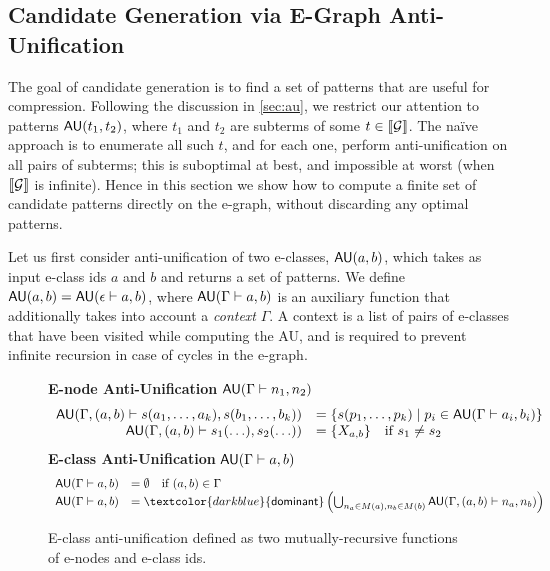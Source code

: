 \subsection{Candidate Generation via E-Graph Anti-Unification}

The goal of candidate generation is to find a set of patterns
that are useful for compression.
%
Following the discussion in \autoref{sec:au},
we restrict our attention to patterns $\mathsf{AU}(t_1, t_2)$,
where $t_1$ and $t_2$ are subterms of some $t \in \llbracket \mathcal{G} \rrbracket$.
%
The na\"ive approach is to enumerate all such $t$,
and for each one, perform anti-unification on all pairs of subterms;
this is suboptimal at best,
and impossible at worst (when $\llbracket \mathcal{G} \rrbracket$ is infinite).
%
Hence in this section we show how to compute a finite set of candidate patterns 
directly on the e-graph,
without discarding any optimal patterns.

%
Let us first consider anti-unification of two e-classes, $\mathsf{AU}(a,b)$,
which takes as input e-class ids $a$ and $b$
and returns a set of patterns.
%
We define $\mathsf{AU}(a,b) = \mathsf{AU}(\epsilon \vdash a,b)$,
where $\mathsf{AU}(\Gamma \vdash a,b)$ is an auxiliary function
that additionally takes into account a \emph{context} $\Gamma$.
%
A context is a list of pairs of e-classes that have been visited while computing the AU,
and is required to prevent infinite recursion in case of cycles in the e-graph.


\begin{figure}
  \textbf{E-node Anti-Unification} $\mathsf{AU}(\Gamma \vdash n_1,n_2)$
  $$
  \begin{array}{rl}
    \mathsf{AU}(\Gamma, (a,b) \vdash s(a_1,\ldots,a_k),s(b_1,\ldots,b_k)) &= \{s(p_1,\ldots,p_k) \mid p_i \in \mathsf{AU}(\Gamma \vdash a_i,b_i)\}\\
    \mathsf{AU}(\Gamma, (a,b) \vdash s_1(\ldots),s_2(\ldots)) &= \{X_{a,b}\} \quad\text{if}\ s_1 \neq s_2\\
    \end{array}
  $$
  \textbf{E-class Anti-Unification} $\mathsf{AU}(\Gamma \vdash a,b)$
  $$
  \begin{array}{rl}
    \ecau{\Gamma}{a}{b} &= \emptyset \quad\text{if}\ (a,b) \in \Gamma\\
    \ecau{\Gamma}{a}{b} &= \textcolor{darkblue}{\dominant} \left(
       \bigcup_{n_a \in M(a), n_b \in M(b)} \ecau{\Gamma, (a, b)}{n_a}{n_b} 
    \right)
  \end{array}
  $$
\caption{E-class anti-unification defined as two mutually-recursive functions of e-nodes and e-class ids.}\label{fig:ecau}
\end{figure}

